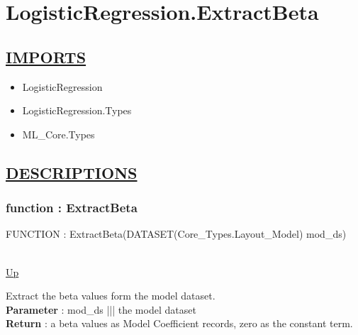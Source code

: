 \chapter*{LogisticRegression.ExtractBeta}
\hypertarget{LogisticRegression.ExtractBeta}{}

\section*{\underline{IMPORTS}}
\begin{itemize}
\item LogisticRegression
\item LogisticRegression.Types
\item ML\_Core.Types
\end{itemize}

\section*{\underline{DESCRIPTIONS}}
\subsection*{function : ExtractBeta}
\hypertarget{ecldoc:logisticregression.extractbeta}{FUNCTION : ExtractBeta(DATASET(Core\_Types.Layout\_Model) mod\_ds)} \\
\hyperlink{ecldoc:}{Up} \\
\par
Extract the beta values form the model dataset. \\
\textbf{Parameter} : mod\_ds ||| the model dataset \\
\textbf{Return} : a beta values as Model Coefficient records, zero as the constant term. \\
